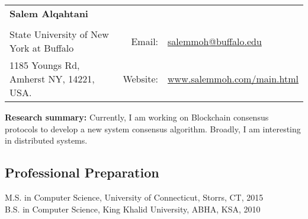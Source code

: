 \documentclass[12pt,]{scrartcl}
\date{}
\begin{document}
\begin{table}[h]
{\def\arraystretch{1.1}\tabcolsep=0pt
\begin{tabular}{p{0.60\linewidth}p{0.05\linewidth}p{0.35\linewidth}}

\multirow{1}{*}{\LARGE \textbf{Salem Alqahtani}} &  &  \\

& & \\


State University of New York at Buffalo & \multicolumn{1}{r}{Email:\;\;} &\multicolumn{1}{l}{\href{salemmoh@buffalo.edu}{salemmoh@buffalo.edu}} \\

1185 Youngs Rd, Amherst NY, 14221, USA. & \multicolumn{1}{r}{Website:\;\;} & \multicolumn{1}{l}{\url{www.salemmoh.com/main.html}} \\
  
\end{tabular}}
\end{table}


\textbf{Research summary:} Currently, I am working on Blockchain consensus protocols to develop a new system consensus algorithm. Broadly, I am interesting in distributed systems. \\


\subsection{Professional Preparation}

M.S. in Computer Science, University of Connecticut, Storrs, CT, 2015 \\  %
B.S. in Computer Science, King Khalid University, ABHA, KSA, 2010 \\ %

\end{document}
